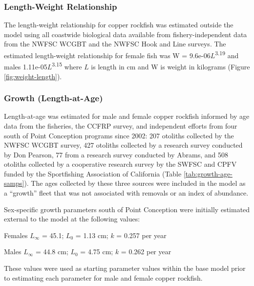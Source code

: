 \documentclass[11pt,
  english,
  letterpaper,
]{article}
\begin{document}
\hypertarget{length-weight-relationship}{%
\subsubsection{Length-Weight Relationship}\label{length-weight-relationship}}

The length-weight relationship for copper rockfish was estimated outside the model using all coastwide biological data available from fishery-independent data from the NWFSC WCGBT and the NWFSC Hook and Line surveys. The estimated length-weight relationship for female fish was W = 9.6e-06\(L\)\textsuperscript{3.19} and males 1.11e-05\(L\)\textsuperscript{3.15} where \(L\) is length in cm and W is weight in kilograms (Figure \ref{fig:weight-length}).

\hypertarget{length-at-age}{%
\subsubsection{Growth (Length-at-Age)}\label{length-at-age}}

Length-at-age was estimated for male and female copper rockfish informed by age data from the fisheries, the CCFRP survey, and independent efforts from four south of Point Conception programs since 2002: 207 otoliths collected by the NWFSC WCGBT survey, 427 otoliths collected by a research survey conducted by Don Pearson, 77 from a research survey conducted by Abrams, and 508 otoliths collected by a cooperative research survey by the SWFSC and CPFV funded by the Sportfishing Association of California (Table \ref{tab:growth-age-samps}). The ages collected by these three sources were included in the model as a ``growth'' fleet that was not associated with removals or an index of abundance.

Sex-specific growth parameters south of Point Conception were initially estimated external to the model at the following values:

\begin{centering}

Females $L_{\infty}$ = 45.1; $L_0$ = 1.13 cm; $k$ = 0.257 per year

Males $L_{\infty}$ = 44.8 cm; $L_0$ = 4.75 cm; $k$ = 0.262 per year

\end{centering}

\vspace{0.50cm}

These values were used as starting parameter values within the base model prior to estimating each parameter for male and female copper rockfish.
\end{document}
